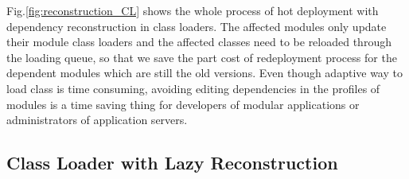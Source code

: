 \documentclass[conference]{IEEEtran}
\begin{document}
Fig.\ref{fig:reconstruction_CL} shows the whole process of hot deployment with dependency reconstruction in class loaders. 
The affected modules only update their module class loaders and the affected classes need to be reloaded through the loading queue, so that we save the part cost of redeployment process for the dependent modules which are still the old versions. 
Even though adaptive way to load class is time consuming, avoiding editing dependencies in the profiles of modules is a time saving thing for developers of modular applications or administrators of application servers.


\subsection{Class Loader with Lazy Reconstruction}
\end{document}
